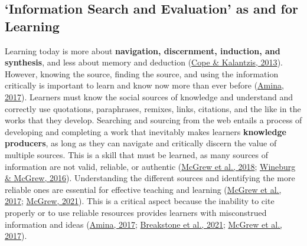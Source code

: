 \documentclass[letterpaper, nobind]{templates/ociamthesis}
\begin{document}
\hypertarget{sec-bg-learn-info-eval}{%
\subsection{`Information Search and Evaluation' as and for Learning}\label{sec-bg-learn-info-eval}}

Learning today is more about \textbf{navigation, discernment, induction, and
synthesis}, and less about memory and deduction (\protect\hyperlink{ref-cope2013new}{Cope \& Kalantzis, 2013}).
However, knowing the source, finding the source, and using the
information critically is important to learn and know now more than ever
before (\protect\hyperlink{ref-amina2017active}{Amina, 2017}). Learners must know the social sources of
knowledge and understand and correctly use quotations, paraphrases,
remixes, links, citations, and the like in the works that they develop.
Searching and sourcing from the web entails a process of developing and
completing a work that inevitably makes learners \textbf{knowledge
producers}, as long as they can navigate and critically discern the
value of multiple sources. This is a skill that must be learned, as many
sources of information are not valid, reliable, or authentic
(\protect\hyperlink{ref-mcgrew2018can}{McGrew et al., 2018}; \protect\hyperlink{ref-wineburg2016students}{Wineburg \& McGrew, 2016}). Understanding the different
sources and identifying the more reliable ones are essential for
effective teaching and learning
(\protect\hyperlink{ref-mcgrew2017challenge}{McGrew et al., 2017}; \protect\hyperlink{ref-mcgrew2021skipping}{McGrew, 2021}). This is a critical aspect
because the inability to cite properly or to use reliable resources
provides learners with misconstrued information and ideas
(\protect\hyperlink{ref-amina2017active}{Amina, 2017}; \protect\hyperlink{ref-breakstone2021students}{Breakstone et al., 2021}; \protect\hyperlink{ref-mcgrew2017challenge}{McGrew et al., 2017}).
\end{document}
